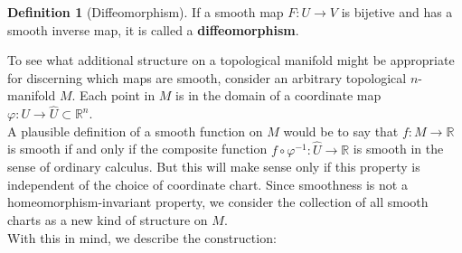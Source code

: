 \documentclass[reqno]{amsart}
\theoremstyle{plain}%
\theoremstyle{definition}
\newtheorem{definition}[theorem]{Definition}
\theoremstyle{remark}
\begin{document}
            \begin{definition}[Diffeomorphism]
                If a smooth map $F  \colon U \to V$ is bijetive and has a smooth inverse
                map, it is called a \textbf{diffeomorphism}.
            \end{definition}
            To see what additional structure on a topological manifold might be appropriate
            for discerning which maps are smooth, consider an arbitrary topological
            $n$-manifold $M$. Each point in $M$ is in the domain of a coordinate map
            $\varphi  \colon U \to \hat{U}\subset \mathbb{R}^{n}$.\\
            A plausible definition of a smooth function on $M$ would be to say that
            $f  \colon M \to \mathbb{R}$ is smooth if and only if the composite function
            $f \circ \varphi^{-1}  \colon \hat{U} \to \mathbb{R}$ is smooth in the sense of
            ordinary calculus. But this will make sense only if this property is
            independent of the choice of coordinate chart. Since smoothness is not
            a homeomorphism-invariant property, we consider the collection of all smooth
            charts as a new kind of structure on $M$.\\
            \linebreak
            With this in mind, we describe the construction:
\end{document}
